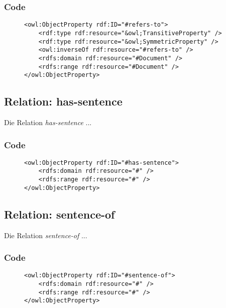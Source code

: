 \documentclass[
    11pt,
    latin1,
    a4paper,
    oneside
]{scrreprt}
\begin{document}
\subsubsection{Code} \label{sec:rel_refersto_code}

\begin{figure}[h]
 \lstset{language=XML}
 \begin{lstlisting}[label=owl:word]
<owl:ObjectProperty rdf:ID="#refers-to">
	<rdf:type rdf:resource="&owl;TransitiveProperty" />
	<rdf:type rdf:resource="&owl;SymmetricProperty" />
	<owl:inverseOf rdf:resource="#refers-to" />
	<rdfs:domain rdf:resource="#Document" />
	<rdfs:range rdf:resource="#Document" />
</owl:ObjectProperty>
 \end{lstlisting}
\end{figure}


\subsection{Relation: has-sentence} \label{sec:rel_hassentence}

Die Relation \emph{has-sentence} ...

\subsubsection{Code} \label{sec:rel_hassentence_code}

\begin{figure}[h]
 \lstset{language=XML}
 \begin{lstlisting}[label=owl:word]
<owl:ObjectProperty rdf:ID="#has-sentence">
	<rdfs:domain rdf:resource="#" />
	<rdfs:range rdf:resource="#" />
</owl:ObjectProperty>
 \end{lstlisting}
\end{figure}


\subsection{Relation: sentence-of} \label{sec:rel_sentenceof}

Die Relation \emph{sentence-of} ...

\subsubsection{Code} \label{sec:rel_sentenceof_code}

\begin{figure}[h]
 \lstset{language=XML}
 \begin{lstlisting}[label=owl:word]
<owl:ObjectProperty rdf:ID="#sentence-of">
	<rdfs:domain rdf:resource="#" />
	<rdfs:range rdf:resource="#" />
</owl:ObjectProperty>
 \end{lstlisting}
\end{figure}
\end{document}
